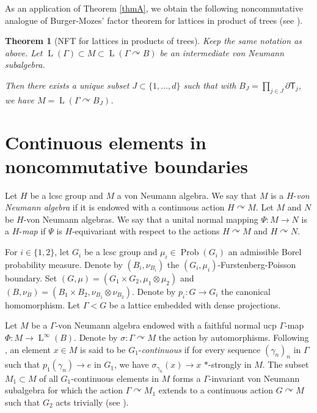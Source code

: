 \documentclass[11pt]{article}
\newtheorem{letterthm}{Theorem}
\theoremstyle{definition}
\DeclareMathOperator{\Prob}{Prob}
\DeclareMathOperator{\rL}{L}
\begin{document}
As an application of Theorem \ref{thmA}, we obtain the following noncommutative analogue of Burger-Mozes'\! factor theorem for lattices in product of trees (see \cite[Th.\,4.6]{BM00b}).

\begin{letterthm}[NFT for lattices in products of trees]\label{thmC}
Keep the same notation as above. Let $\rL(\Gamma) \subset M \subset \rL(\Gamma \curvearrowright B)$ be an intermediate von Neumann subalgebra.

Then there exists a unique subset $J \subset \{1, \dots, d\}$ such that with $B_J = \prod_{j \in J} \partial \mathsf T_j$, we have $M = \rL(\Gamma \curvearrowright B_J)$.
\end{letterthm}

\section{Continuous elements in noncommutative boundaries}

Let $H$ be a lcsc group and $M$ a von Neumann algebra. We say that $M$ is a $H$-\emph{von Neumann algebra} if it is endowed with a continuous action $H \curvearrowright M$. Let $M$ and $N$ be $H$-von Neumann algebras. We say that a unital normal mapping $\Psi : M \to N$ is a $H$-\emph{map} if $\Psi$ is $H$-equivariant with respect to the actions $H \curvearrowright M$ and $H \curvearrowright N$.

For $i \in \{1, 2\}$, let $G_i$ be a lcsc group and $\mu_i \in \Prob(G_i)$ an admissible Borel probability measure. Denote by $(B_i, \nu_{B_i})$ the $(G_i, \mu_i)$-Furstenberg-Poisson boundary. Set $(G, \mu) = (G_1 \times G_2, \mu_1 \otimes \mu_2)$ and $(B, \nu_B) = (B_1 \times B_2, \nu_{B_1} \otimes \nu_{B_2})$. Denote by $p_i : G \to G_i$ the canonical homomorphism. Let $\Gamma < G$ be a lattice embedded with dense projections.

Let $M$ be a $\Gamma$-von Neumann algebra endowed with a faithful normal ucp $\Gamma$-map $\Phi : M \to \rL^\infty(B)$. Denote by $\sigma : \Gamma \curvearrowright M$ the action by automorphisms. Following \cite[Def.\,5.3]{BBHP20}, an element $x \in M$ is said to be $G_1$-\emph{continuous} if for every sequence $(\gamma_n)_n$ in $\Gamma$ such that $p_1(\gamma_n) \to e$ in $G_1$, we have $\sigma_{\gamma_n}(x) \to x$ $\ast$-strongly in $M$. The subset $M_1 \subset M$ of all $G_1$-continuous elements in $M$ forms a $\Gamma$-invariant von Neumann subalgebra for which the action $\Gamma \curvearrowright M_1$ extends to a continuous action $G \curvearrowright M$ such that $G_2$ acts trivially (see \cite[Th.\,5.5]{BBHP20}).
\end{document}

